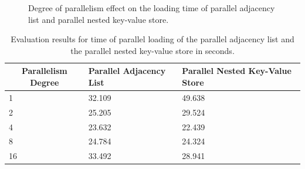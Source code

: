 {\begin{itemize}
\begin{figure}[H]
\centering
\centering
    \caption{Degree of parallelism effect on the loading time of parallel adjacency list and parallel nested key-value store.}
    \label{fig:Parallel-Loading}
\end{figure}



\begin{table}[H]
\centering
\begin{tabular}{@{}|l||l|l|@{}}
\toprule
\multicolumn{1}{|c||}{Parallelism Degree} & Parallel Adjacency List & Parallel Nested Key-Value Store \\ \midrule
1 & 32.109 & 49.638\\ \midrule
2 & 25.205 & 29.524 \\ \midrule
4 & 23.632 & 22.439 \\ \midrule
8 & 24.784 & 24.324 \\ \midrule
16 & 33.492 & 28.941 \\ \bottomrule
\end{tabular}%
\caption{Evaluation results for time of parallel loading of the parallel adjacency list and the parallel nested key-value store in seconds.}
\label{tbl-EvalResults-Parallel-Loading}
\end{table}






\end{itemize}}
